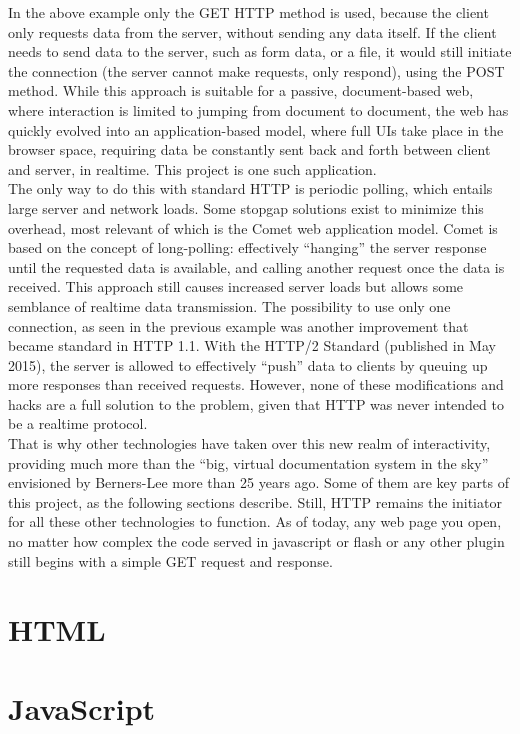 In the above example only the GET HTTP method is used, because the client only requests data from the server, without sending any data itself. If the client needs to send data to the server, such as form data, or a file, it would still initiate the connection (the server cannot make requests, only respond), using the POST method. While this approach is suitable for a passive, document-based web, where interaction is limited to jumping from document to document, the web has quickly evolved into an application-based model, where full UIs take place in the browser space, requiring data be constantly sent back and forth between client and server, in realtime. This project is one such application.\\

The only way to do this with standard HTTP is periodic polling, which entails large server and network loads. Some stopgap solutions exist to minimize this overhead, most relevant of which is the Comet web application model. Comet is based on the concept of long-polling: effectively ``hanging'' the server response until the requested data is available, and calling another request once the data is received. This approach  still causes increased server loads but allows some semblance of realtime data transmission. The possibility to use only one connection, as seen in the previous example was another improvement that became standard in HTTP 1.1. With the HTTP/2 Standard (published in May 2015), the server is allowed to effectively ``push'' data to clients by queuing up more responses than received requests. However, none of these modifications and hacks are a full solution to the problem, given that HTTP was never intended to be a realtime protocol.\\

That is why other technologies have taken over this new realm of interactivity, providing much more than the ``big, virtual documentation system in the sky'' envisioned by Berners-Lee more than 25 years ago. Some of them are key parts of this project, as the following sections describe. Still, HTTP remains the initiator for all these other technologies to function. As of today, any web page you open, no matter how complex the code served in javascript or flash or any other plugin still begins with a simple GET request and response.
\section{HTML}
\section{JavaScript}
